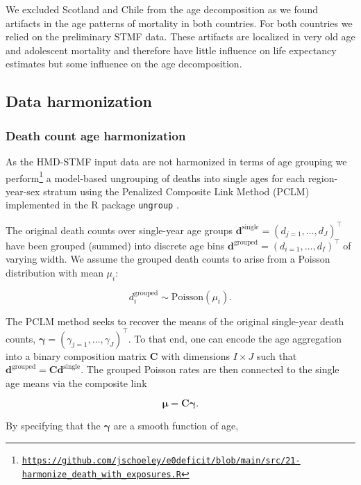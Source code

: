\documentclass[12pt]{article}
\begin{document}
We excluded Scotland and Chile from the age decomposition as we found artifacts in the age patterns of mortality in both countries. For both countries we relied on the preliminary STMF data. These artifacts are localized in very old age and adolescent mortality and therefore have little influence on life expectancy estimates but some influence on the age decomposition.

\subsection{Data harmonization}

\subsubsection{Death count age harmonization}

As the HMD-STMF input data are not harmonized in terms of age grouping we perform\footnote{\href{https://github.com/jschoeley/e0deficit/blob/main/src/21-harmonize_death_with_exposures.R}{\texttt{https://github.com/jschoeley/e0deficit/blob/main/src/21-harmonize\_death\_with\_exposures.R}}} a model-based ungrouping of deaths into single ages for each region-year-sex stratum using the Penalized Composite Link Method (PCLM) \citep{Rizzi2015} implemented in the R package \texttt{ungroup} \citep{Pascariu2018}.

The original death counts over single-year age groups $\mathbf{d}^\mathrm{single}=\left(d_{j=1}, \ldots, d_J\right)^\intercal$ have been grouped (summed) into discrete age bins $\mathbf{d}^\mathrm{grouped}=\left(d_{i=1}, \ldots, d_I\right)^\intercal$ of varying width. We assume the grouped death counts to arise from a Poisson distribution with mean $\mu_i$:

$$
d^\mathrm{grouped}_i \sim \mathrm{Poisson}\left(\mu_i\right).
$$

The PCLM method seeks to recover the means of the original single-year death counts, $\boldsymbol{\gamma} = \left(\gamma_{j=1}, \ldots, \gamma_J\right)^\intercal$. To that end, one can encode the age aggregation into a binary composition matrix $\mathbf{C}$ with dimensions $I\times J$ such that $\mathbf{d}^\mathrm{grouped} = \mathbf{C}\mathbf{d}^\mathrm{single}$. The grouped Poisson rates are then connected to the single age means via the composite link

$$
\boldsymbol{\mu} = \mathbf{C}\boldsymbol{\gamma}.
$$

By specifying that the $\boldsymbol{\gamma}$ are a smooth function of age,
\end{document}
